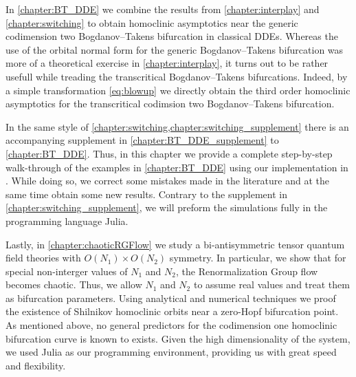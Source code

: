 In \cref{chapter:BT_DDE} we combine the results from \cref{chapter:interplay} and
\cref{chapter:switching} to obtain homoclinic asymptotics near the generic
codimension two Bogdanov--Takens bifurcation in classical DDEs. Whereas the use
of the orbital normal form for the generic Bogdanov--Takens bifurcation was more
of a theoretical exercise in \cref{chapter:interplay}, it turns out to be rather
usefull while treading the transcritical Bogdanov--Takens bifurcations. Indeed, by
a simple transformation \cref{eq:blowup} we directly obtain the third order
homoclinic asymptotics for the transcritical codimsion two Bogdanov--Takens
bifurcation.

In the same style of \cref{chapter:switching,chapter:switching_supplement} there
is an accompanying supplement in \cref{chapter:BT_DDE_supplement} to
\cref{chapter:BT_DDE}. Thus, in this chapter we provide a complete step-by-step
walk-through of the examples in \cref{chapter:BT_DDE} using our implementation in
\DDEBIFTOOL. While doing so, we correct some mistakes made in the literature and
at the same time obtain some new results. Contrary to the supplement in
\cref{chapter:switching_supplement}, we will preform the simulations fully in the
programming language Julia.

Lastly, in \cref{chapter:chaoticRGFlow} we study a bi-antisymmetric tensor
quantum field theories with $O(N_1)\times O(N_2)$ symmetry. In particular, we
show that for special non-interger values of $N_1$ and $N_2$, the
Renormalization Group flow becomes chaotic. Thus, we allow $N_1$ and $N_2$ to
assume real values and treat them as bifurcation parameters. Using
analytical and numerical techniques we proof the existence of
Shilnikov homoclinic orbits near a zero-Hopf bifurcation point. As mentioned
above, no general predictors for the codimension one homoclinic bifurcation
curve is known to exists. Given the high dimensionality of the system, we
used Julia as our programming environment, providing us with great speed
and flexibility.


